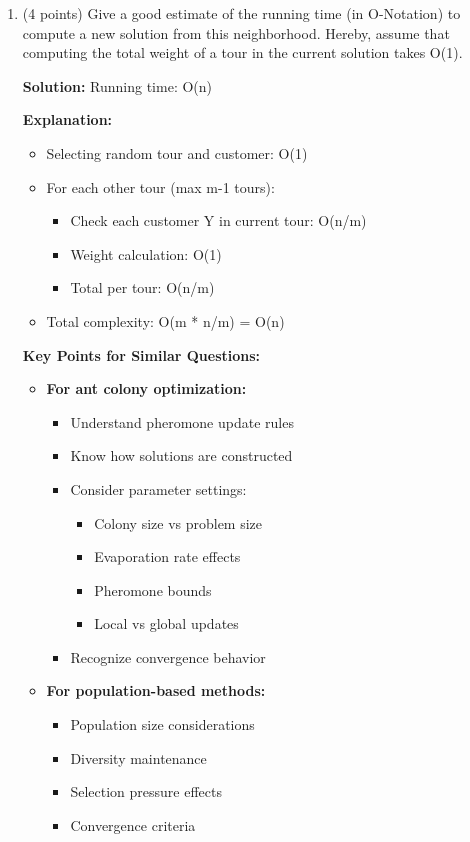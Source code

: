 \begin{enumerate}[label=\alph*)]
\item (4 points) Give a good estimate of the running time (in O-Notation) to compute a new solution from this neighborhood. Hereby, assume that computing the total weight of a tour in the current solution takes O(1).

\textbf{Solution:} Running time: O(n)

\textbf{Explanation:}
\begin{itemize}
\item Selecting random tour and customer: O(1)
\item For each other tour (max m-1 tours):
  \begin{itemize}
  \item Check each customer Y in current tour: O(n/m)
  \item Weight calculation: O(1)
  \item Total per tour: O(n/m)
  \end{itemize}
\item Total complexity: O(m * n/m) = O(n)
\end{itemize}

\textbf{Key Points for Similar Questions:}
\begin{itemize}
\item \textbf{For ant colony optimization:}
  \begin{itemize}
  \item Understand pheromone update rules
  \item Know how solutions are constructed
  \item Consider parameter settings:
    \begin{itemize}
    \item Colony size vs problem size
    \item Evaporation rate effects
    \item Pheromone bounds
    \item Local vs global updates
    \end{itemize}
  \item Recognize convergence behavior
  \end{itemize}

\item \textbf{For population-based methods:}
  \begin{itemize}
  \item Population size considerations
  \item Diversity maintenance
  \item Selection pressure effects
  \item Convergence criteria
  \end{itemize}


\end{itemize}
\end{enumerate}
